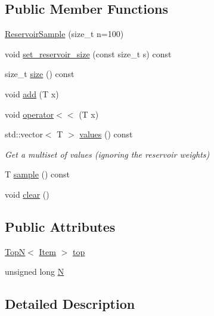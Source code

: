 \subsection*{Public Member Functions}
\begin{DoxyCompactItemize}
\item 
\hyperlink{class_reservoir_sample_ab7437194c7a1c9a0e9f84f95386d4861}{Reservoir\+Sample} (size\+\_\+t n=100)
\item 
void \hyperlink{class_reservoir_sample_ae67a44361cb145cc2f355290ff4babad}{set\+\_\+reservoir\+\_\+size} (const size\+\_\+t s) const
\item 
size\+\_\+t \hyperlink{class_reservoir_sample_a53a41ec89cedfec21c7924aa98347659}{size} () const
\item 
void \hyperlink{class_reservoir_sample_a471e41debe8c7081cbae2f5a1ca4ab54}{add} (T x)
\item 
void \hyperlink{class_reservoir_sample_a06e60e404cf49a9261f51d6b07bbf017}{operator$<$$<$} (T x)
\item 
std\+::vector$<$ T $>$ \hyperlink{class_reservoir_sample_a0f0abf510882715b487f2254b6af25b1}{values} () const
\begin{DoxyCompactList}\small\item\em Get a multiset of values (ignoring the reservoir weights) \end{DoxyCompactList}\item 
T \hyperlink{class_reservoir_sample_adc52ee8c3b5cbb7fd364315614d35595}{sample} () const
\item 
void \hyperlink{class_reservoir_sample_a8527b800cc94f227a7793e8c93055d82}{clear} ()
\end{DoxyCompactItemize}
\subsection*{Public Attributes}
\begin{DoxyCompactItemize}
\item 
\hyperlink{class_top_n}{TopN}$<$ \hyperlink{struct_reservoir_sample_1_1_item}{Item} $>$ \hyperlink{class_reservoir_sample_a94a92f438328cbca4aa5f0ba92867142}{top}
\item 
unsigned long \hyperlink{class_reservoir_sample_a33f6cc3a51f9591f6e25dacf0cf8e663}{N}
\end{DoxyCompactItemize}


\subsection{Detailed Description}
